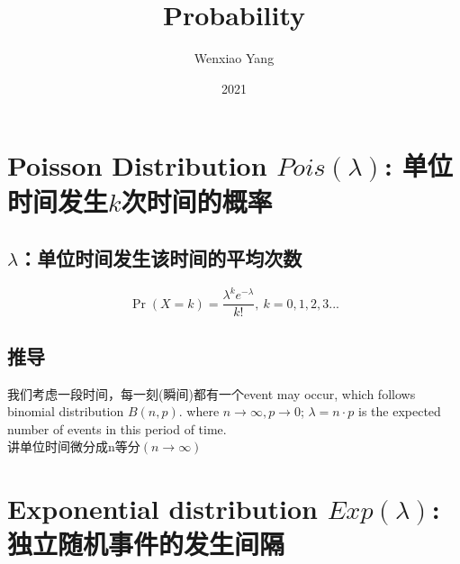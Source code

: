 \documentclass[11pt,a4paper]{article}
\title{Probability}
\author[*]{Wenxiao Yang}
\affil[*]{Department of Mathematics, University of Illinois at Urbana-Champaign}
\date{2021}
\begin{document}
\maketitle
\tableofcontents
\newpage


\section{Poisson Distribution $Pois(\lambda)$: 单位时间发生$k$次时间的概率}
\subsection{$\lambda$：单位时间发生该时间的平均次数}
$$\Pr(X{=}k)= \frac{\lambda^k e^{-\lambda}}{k!},\ k=0,1,2,3...$$
\subsection{推导}
我们考虑一段时间，每一刻(瞬间)都有一个event may occur, which follows binomial distribution $B(n,p)$. where $n \rightarrow \infty, p \rightarrow 0$; $\lambda=n\cdot p$ is the expected number of events in this period of time.\\
讲单位时间微分成n等分$(n \rightarrow \infty)$































\section{Exponential distribution $Exp(\lambda)$: 独立随机事件的发生间隔}
\end{document}
